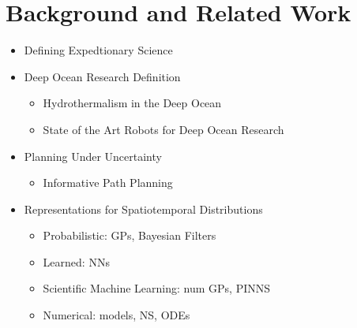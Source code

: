 \chapter{Background and Related Work}

\begin{itemize}
    \item Defining Expedtionary Science
    \item Deep Ocean Research Definition
    \begin{itemize}
        \item Hydrothermalism in the Deep Ocean
        \item State of the Art Robots for Deep Ocean Research
    \end{itemize}
    \item Planning Under Uncertainty
    \begin{itemize}
        \item Informative Path Planning
    \end{itemize}
    \item Representations for Spatiotemporal Distributions
    \begin{itemize}
        \item Probabilistic: GPs, Bayesian Filters
        \item Learned: NNs
        \item Scientific Machine Learning: num GPs, PINNS
        \item Numerical: models, NS, ODEs
    \end{itemize}
\end{itemize}